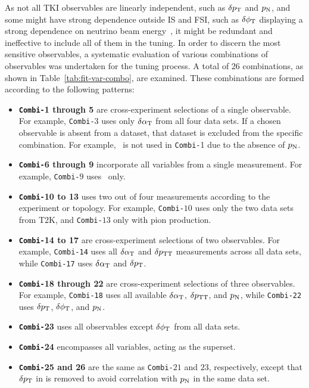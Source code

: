     As not all TKI observables are linearly independent, such as $\delta p_\textrm{T}$ and $p_\textrm{N}$, and some might have strong dependence outside IS and FSI, such as $\delta\phi_\textrm{T}$ displaying a strong dependence on neutrino beam energy~\cite{Lu:2015tcr}, it might be redundant and ineffective to include all of them in the tuning.
    In order to discern the most sensitive observables, a systematic evaluation of various combinations of observables was undertaken for the tuning process. 
    A total of 26 combinations, as shown in Table~\ref{tab:fit-var-combo}, are examined. 
    These combinations are formed according to the following patterns:
    \begin{itemize}
        \item \textbf{\texttt{Combi-}1 through 5} are cross-experiment selections of a single observable. 
        For example, \texttt{Combi-}$3$ uses only $\delta\alpha_\textrm{T}$ from all four data sets. 
        If a chosen observable is absent from a dataset, that dataset is excluded from the specific combination. 
        For example, \ttkzpi\ is not used in \texttt{Combi-}1 due to the absence of $p_\textrm{N}$.
        \item \textbf{\texttt{Combi-}6 through 9} incorporate all variables from a single measurement. For example, \texttt{Combi-}$9$ uses \minpiz\ only.
        \item \textbf{\texttt{Combi-}10 to 13} uses two out of four measurements according to the experiment or topology. For example, \texttt{Combi-}$10$ uses only the two data sets from T2K, and \texttt{Combi-}$13$  only with pion production. 
        \item \textbf{\texttt{Combi-}14 to 17} are cross-experiment selections of two observables. 
        For example, \texttt{Combi-14} uses all $\delta\alpha_\textrm{T}$ and $\delta p_\textrm{TT}$ measurements across all data sets, while \texttt{Combi-17} uses $\delta\alpha_\textrm{T}$ and $\delta p_\textrm{T}$.
        \item \textbf{\texttt{Combi-}18 through 22} are cross-experiment selections of three observables. 
        For example, \texttt{Combi-18} uses all available $\delta\alpha_\textrm{T}$, $\delta p_\textrm{TT}$, and $p_\textrm{N}$, while \texttt{Combi-22} uses $\delta p_\textrm{T}$, $\delta\phi_\textrm{T}$, and $p_\textrm{N}$.
        \item \textbf{\texttt{Combi-}23} uses all observables except $\delta\phi_\textrm{T}$ from all data sets.
        \item \textbf{\texttt{Combi-}24} encompasses all variables, acting as the superset.
        \item \textbf{\texttt{Combi-}25 and 26} are the same as \texttt{Combi-}$21$ and $23$, respectively, except that $\delta p_\textrm{T}$ in \minzpi is removed to avoid correlation with $p_\textrm{N}$ in the same data set.
    \end{itemize}

